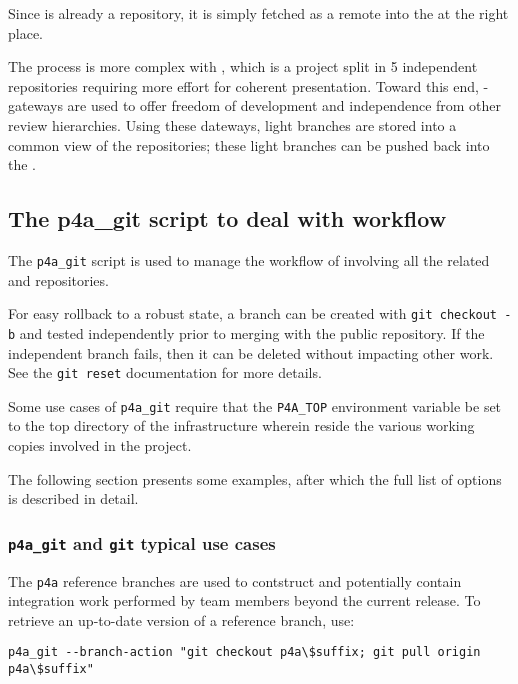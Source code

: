 \documentclass[a4paper]{article}
\begin{document}
Since \Apolylib is already a \Agit repository, it is simply fetched as a
remote \Agit into the \Apfa at the right place.

The process is more complex with \Apips, which is a project split in 5
independent \Asvn repositories requiring more effort for coherent presentation.
Toward this end, \Asvn-\Agit gateways are used to offer freedom of
development and independence from other review hierarchies. Using
these dateways, light
branches are stored into a common \Agit view of the \Apips{} \Asvn
repositories; these light branches can be pushed back into the \Apips{} \Asvn.

\subsection{The p4a\_git script to deal with workflow}
\label{sec:p4a_git-script-deal}

The \verb|p4a_git| script is used to manage the workflow of \Apfa
involving all the related \Agit and \Asvn repositories.

For easy rollback to a robust state, a branch can be created with
\texttt{git checkout -b} and tested independently prior to merging
with the public repository. If the independent branch fails, then it
can be deleted without impacting other work.
See the \texttt{git reset} documentation for more details.

Some use cases of \verb|p4a_git| require that the \verb|P4A_TOP|
environment variable be set to the top directory of the \Apfa
infrastructure wherein reside the various \Agit working copies involved in the
project.

The following section presents some examples, after which the full
list of options is described in detail.

\subsubsection{\protect\texttt{p4a\_git} and \protect\texttt{git} typical use cases}
\label{sec:p4a_git-typical-use}

The \Apfa \texttt{p4a} reference branches are used to contstruct \Apfa
and potentially contain integration work performed by \Apfa team
members beyond the current release. To retrieve an up-to-date version
of a reference branch, use:
\begin{verbatim}
p4a_git --branch-action "git checkout p4a\$suffix; git pull origin p4a\$suffix"
\end{verbatim}
\end{document}
